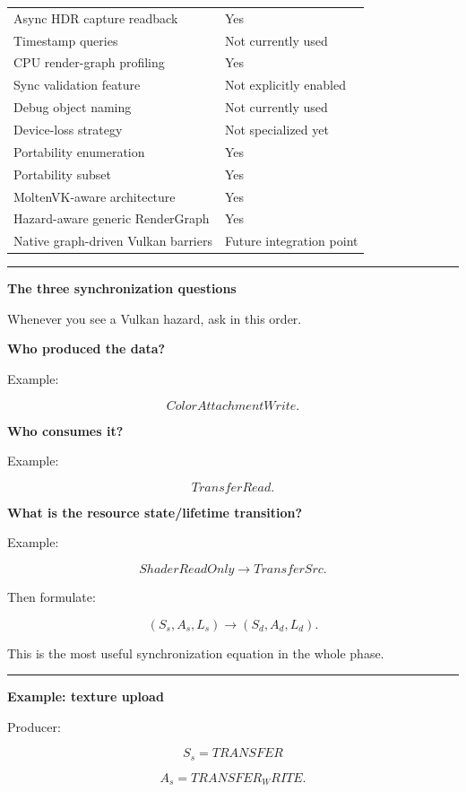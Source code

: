 {\begin{longtable}[]{@{}
  >{\raggedright\arraybackslash}p{}
  >{\raggedright\arraybackslash}p{}@{}}
Async HDR capture readback & Yes \\
Timestamp queries & Not currently used \\
CPU render-graph profiling & Yes \\
Sync validation feature & Not explicitly enabled \\
Debug object naming & Not currently used \\
Device-loss strategy & Not specialized yet \\
Portability enumeration & Yes \\
Portability subset & Yes \\
MoltenVK-aware architecture & Yes \\
Hazard-aware generic RenderGraph & Yes \\
Native graph-driven Vulkan barriers & Future integration point \\
\end{longtable}
}

\begin{center}\rule{0.5\linewidth}{0.5pt}\end{center}

\textbf{The three synchronization questions}

Whenever you see a Vulkan hazard, ask in this order.

\textbf{Who produced the data?}

Example:

\[
ColorAttachmentWrite.
\]

\textbf{Who consumes it?}

Example:

\[
TransferRead.
\]

\textbf{What is the resource state/lifetime transition?}

Example:

\[
ShaderReadOnly
\rightarrow
TransferSrc.
\]

Then formulate:

\[
(S_s,A_s,L_s)
\rightarrow
(S_d,A_d,L_d).
\]

This is the most useful synchronization equation in the whole phase.

\begin{center}\rule{0.5\linewidth}{0.5pt}\end{center}

\textbf{Example: texture upload}

Producer:

\[
S_s=TRANSFER
\]

\[
A_s=TRANSFER_WRITE.
\]

